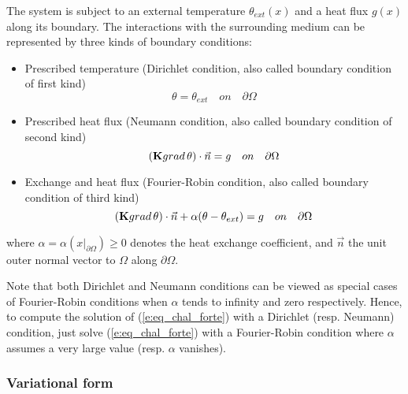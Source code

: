 The system is subject to an external temperature $\theta_{ext}(x)$ and a heat flux $g(x)$ along its boundary. 
The interactions with the surrounding medium  can be represented by three kinds of boundary conditions:
\begin{itemize}
\item{Prescribed temperature (Dirichlet condition, also called boundary condition of first kind)}\\
\begin{equation} \theta=\theta_{ext} \quad on \quad \partial\Omega \end{equation}
\item{Prescribed heat flux (Neumann condition, also called boundary condition of second kind)}\\
\begin{equation}({\bf K}grad \,\theta)\cdot\vec{n}=g \quad on \quad \partial\Omega \end{equation}
\item{Exchange and heat flux (Fourier-Robin condition, also called boundary condition of third kind)}\\
\begin{equation}({\bf K}grad \,\theta)\cdot\vec{n}+\alpha(\theta-\theta_{ext})=g \quad on \quad \partial\Omega \end{equation}
\end{itemize}
where $\alpha=\alpha(x|_{\partial\Omega})\geq 0$ denotes the heat exchange coefficient, and $\vec{n}$ the unit outer normal vector to $\Omega$ along $\partial\Omega$.

Note that both Dirichlet and Neumann conditions can be viewed as special cases of Fourier-Robin conditions when $\alpha$ tends to infinity and zero respectively. Hence, to compute the solution of (\ref{e:eq_chal_forte}) with a Dirichlet (resp. Neumann) condition, just solve (\ref{e:eq_chal_forte}) with a Fourier-Robin condition where $\alpha$ assumes a very large value (resp. $\alpha$ vanishes).

\subsubsection{Variational form}

